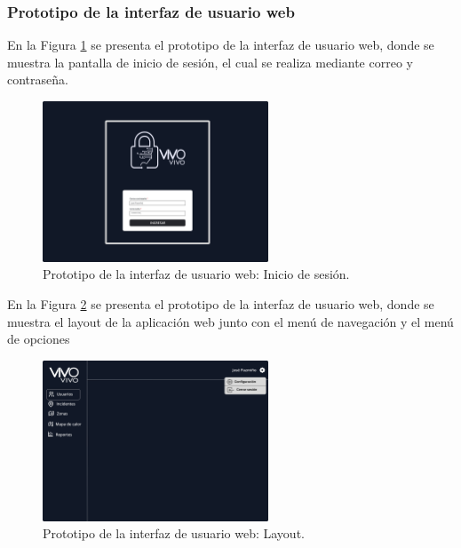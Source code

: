 \subsubsection{Prototipo de la interfaz de usuario web}

En la Figura \ref{fig:prototipo-inicio-sesion-web} se presenta el prototipo de la interfaz de usuario web, donde se muestra la pantalla de inicio de sesión,
el cual se realiza mediante correo y contraseña.

\begin{figure}[H]
    \centering
    \includegraphics[width=0.6\textwidth]{chapters/III-resultados-y-discusion/resources/images/prototipo-inicio-sesion-web.png}
    \caption{Prototipo de la interfaz de usuario web: Inicio de sesión.}
    \label{fig:prototipo-inicio-sesion-web}
\end{figure}

En la Figura \ref{fig:prototipo-layout-web} se presenta el prototipo de la interfaz de usuario web, donde se muestra el layout de la aplicación web junto
con el menú de navegación y el menú de opciones

\begin{figure}[H]
    \centering
    \includegraphics[width=0.6\textwidth]{chapters/III-resultados-y-discusion/resources/images/prototipo-layout-web.png}
    \caption{Prototipo de la interfaz de usuario web: Layout.}
    \label{fig:prototipo-layout-web}
\end{figure}

